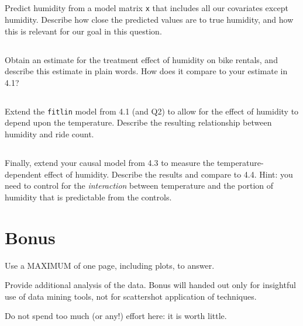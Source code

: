 \documentclass[12pt]{article}
\begin{document}
\subsection{}  Predict humidity from a model matrix {\tt x} that includes all our covariates except humidity.  Describe how close the predicted values are to true humidity, and how this is relevant for our goal in this question.

\subsection{} Obtain an estimate for the treatment effect of humidity on bike rentals, and describe this estimate in plain words.   How does it compare to your estimate in 4.1?

\subsection{} Extend the \texttt{fitlin} model from 4.1 (and Q2) to allow for the effect of humidity to depend upon the temperature.  Describe the resulting relationship between humidity and ride count.

\subsection{} Finally, extend your causal model from 4.3 to measure the temperature-dependent effect of humidity. Describe the results and compare to 4.4.   Hint: you need to control for the {\it interaction} between temperature and the portion of humidity that is predictable from the controls.

\newpage
\section*{Bonus}

{\sc Use a MAXIMUM of one page, including plots, to answer.}

\medskip \noindent
Provide  additional analysis of the data.  Bonus will handed out only for insightful use of data mining tools, not for scattershot application of techniques.

\medskip \noindent
Do not spend too much (or any!) effort here: it is worth little.  
\end{document}
